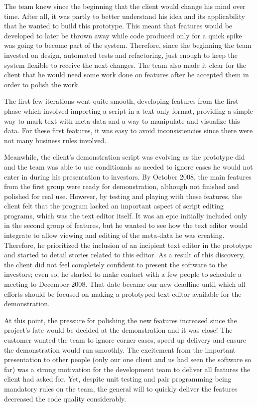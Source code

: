 \documentclass[lnbip]{svmultln}
\begin{document}
The team knew since the beginning that the client would change his
mind over time. After all, it was partly to better understand his idea
and its applicability that he wanted to build this prototype. This
meant that features would be developed to later be thrown away while
code produced only for a quick spike was going to become part of the
system. Therefore, since the beginning the team invested on design,
automated tests and refactoring, just enough to keep the system
flexible to receive the next changes. The team also made it clear for
the client that he would need some work done on features after he
accepted them in order to polish the work.

The first few iterations went quite smooth, developing features from
the first phase which involved importing a script in a text-only
format, providing a simple way to mark text with meta-data and a way
to manipulate and visualize this data. For these first features, it
was easy to avoid inconsistencies since there were not many business
rules involved.

Meanwhile, the client's demonstration script was evolving as the
prototype did and the team was able to use conditionals as needed to
ignore cases he would not enter in during his presentation to
investors. By October 2008, the main features from the first group
were ready for demonstration, although not finished and polished for
real use. However, by testing and playing with these features, the
client felt that the program lacked an important aspect of script
editing programs, which was the text editor itself. It was an epic
initially included only in the second group of features, but he wanted
to see how the text editor would integrate to allow viewing and
editing of the meta-data he was creating. Therefore, he prioritized
the inclusion of an incipient text editor in the prototype and started
to detail stories related to this editor. As a result of this
discovery, the client did not feel completely confident to present the
software to the investors; even so, he started to make contact with a
few people to schedule a meeting to December 2008. That date became
our new deadline until which all efforts should be focused on making a
prototyped text editor available for the demonstration.

At this point, the pressure for polishing the new features increased
since the project's fate would be decided at the demonstration and it
was close! The customer wanted the team to ignore corner cases, speed
up delivery and ensure the demonstration would run smoothly. The
excitement from the important presentation to other people (only our
one client and us had seen the software so far) was a strong
motivation for the development team to deliver all features the client
had asked for. Yet, despite unit testing and pair programming being
mandatory rules on the team, the general will to quickly deliver the
features decreased the code quality considerably.
\end{document}
